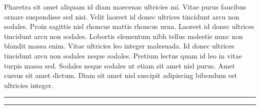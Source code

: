 \documentclass[a4paper]{article}
\begin{document}
Pharetra sit amet aliquam id diam maecenas ultricies mi. Vitae purus faucibus ornare suspendisse sed nisi. Velit laoreet id donec ultrices tincidunt arcu non sodales. Proin sagittis nisl rhoncus mattis rhoncus urna. Laoreet id donec ultrices tincidunt arcu non sodales. Lobortis elementum nibh tellus molestie nunc non blandit massa enim. Vitae ultricies leo integer malesuada. Id donec ultrices tincidunt arcu non sodales neque sodales. Pretium lectus quam id leo in vitae turpis massa sed. Sodales neque sodales ut etiam sit amet nisl purus. Amet cursus sit amet dictum. Diam sit amet nisl suscipit adipiscing bibendum est ultricies integer.


%
% 
%


\noindent\rule{\textwidth}{0.5pt}
\printbibliography[heading=bibintoc]
\noindent\rule{\textwidth}{0.5pt}
\end{document}
